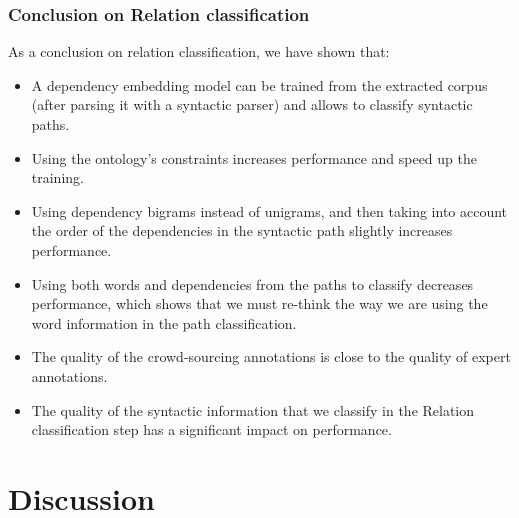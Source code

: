 \documentclass[twocolumn]{article}
\begin{document}
\subsubsection{Conclusion on Relation classification}

As a conclusion on relation classification, we have shown that:
\begin{itemize}
\item A dependency embedding model can be trained from the extracted corpus (after parsing it with a syntactic parser) and allows to classify syntactic paths.
\item Using the ontology's constraints increases performance and speed up the training.
\item Using dependency bigrams instead of unigrams, and then taking into account the order of the dependencies in the syntactic path slightly increases performance.
\item Using both words and dependencies from the paths to classify decreases performance, which shows that we must re-think the way we are using the word information in the path classification.
\item The quality of the crowd-sourcing annotations is close to the quality of expert annotations.
\item The quality of the syntactic information that we classify in the Relation classification step has a significant impact on performance.
\end{itemize}

\section{Discussion}
\end{document}

